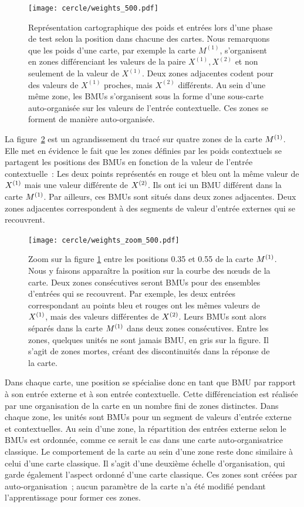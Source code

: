 \documentclass[../main]{subfiles}
\begin{document}
\begin{figure}[ht!]
	\centering\texttt{[image: cercle/weights\_500.pdf]}
	\caption{Représentation cartographique des poids et entrées lors d'une phase de test selon la position dans chacune des cartes. Nous remarquons que les poids d'une carte, par exemple la carte $M^{(1)}$, s'organisent en zones différenciant les valeurs de la paire $X^{(1)}, X^{(2)}$ et non seulement de la valeur de $X^{(1)}$. 
	Deux zones adjacentes codent pour des valeurs de $X^{(1)}$ proches, mais $X^{(2)}$ différents. 
	Au sein d'une même zone, les BMUs s'organisent sous la forme d'une sous-carte auto-organisée sur les valeurs de l'entrée contextuelle. Ces zones se forment de manière auto-organisée. \label{fig:w}}
\end{figure}

La figure~\ref{fig:w_zoom} est un agrandissement du tracé sur quatre zones de la carte $M^{({1})}$.
Elle met en évidence le fait que les zones définies par les poids contextuels se partagent les positions des BMUs en fonction de la valeur de l'entrée contextuelle~:
Les deux points représentés en rouge et bleu ont la même valeur de $X^{({1})}$ mais une valeur différente de $X^{({2})}$. 
Ils ont ici un BMU différent dans la carte $M^{({1})}$. Par ailleurs, ces BMUs sont situés dans deux zones adjacentes.
Deux zones adjacentes correspondent à des segments de valeur d'entrée externes qui se recouvrent.

\begin{figure}[h!]
	\centering\texttt{[image: cercle/weights\_zoom\_500.pdf]}
   \caption{Zoom sur la figure \ref{fig:w} entre les positions 0.35 et 0.55 de la carte $M^{({1})}$. 
   Nous y faisons apparaître la position sur la courbe des n\oe{}uds de la carte.
   Deux zones consécutives seront BMUs pour des ensembles d'entrées qui se recouvrent. Par exemple, les deux entrées correspondant au points bleu et rouges ont les mêmes valeurs de $X^{({1})}$, mais des valeurs différentes de $X^{({2})}$. Leurs BMUs sont alors séparés dans la carte $M^{({1})}$ dans deux zones consécutives.
   Entre les zones, quelques unités ne sont jamais BMU, en gris sur la figure. Il s'agit de zones mortes, créant des discontinuités dans la réponse de la carte.
   \label{fig:w_zoom}}
\end{figure}

Dans chaque carte, une position se spécialise donc en tant que BMU par rapport à son entrée externe et à son entrée contextuelle.
Cette différenciation est réalisée par une organisation de la carte en un nombre fini de zones distinctes. Dans chaque zone, les unités sont BMUs pour un segment de valeurs d'entrée externe et contextuelles. 
Au sein d'une zone, la répartition des entrées externe selon le BMUs est ordonnée, comme ce serait le cas dans une carte auto-organisatrice classique. Le comportement de la carte au sein d'une zone reste donc similaire à celui d'une carte classique.
Il s'agit d'une deuxième échelle d'organisation, qui garde également l'aspect ordonné d'une carte classique. 
Ces zones sont créées par auto-organisation~; aucun paramètre de la carte n'a été modifié pendant l'apprentissage pour former ces zones.
\end{document}
